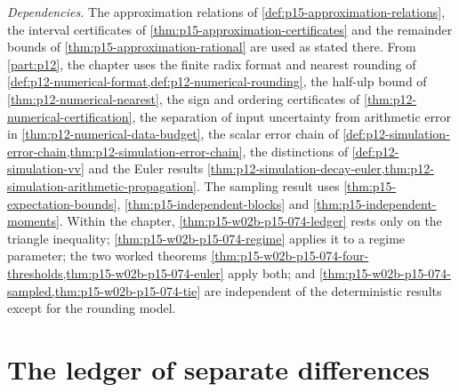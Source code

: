 \emph{Dependencies.} The approximation relations of
\cref{def:p15-approximation-relations}, the interval certificates of
\cref{thm:p15-approximation-certificates} and the remainder bounds of
\cref{thm:p15-approximation-rational} are used as stated there. From
\cref{part:p12}, the chapter uses the finite radix format and nearest
rounding of \cref{def:p12-numerical-format,def:p12-numerical-rounding},
the half-ulp bound of \cref{thm:p12-numerical-nearest}, the sign and
ordering certificates of \cref{thm:p12-numerical-certification}, the
separation of input uncertainty from arithmetic error in
\cref{thm:p12-numerical-data-budget}, the scalar error chain of
\cref{def:p12-simulation-error-chain,thm:p12-simulation-error-chain}, the
distinctions of \cref{def:p12-simulation-vv} and the Euler results
\cref{thm:p12-simulation-decay-euler,thm:p12-simulation-arithmetic-propagation}.
The sampling result uses \cref{thm:p15-expectation-bounds},
\cref{thm:p15-independent-blocks} and \cref{thm:p15-independent-moments}.
Within the chapter, \cref{thm:p15-w02b-p15-074-ledger} rests only on the
triangle inequality; \cref{thm:p15-w02b-p15-074-regime} applies it to a
regime parameter; the two worked theorems
\cref{thm:p15-w02b-p15-074-four-thresholds,thm:p15-w02b-p15-074-euler}
apply both; and \cref{thm:p15-w02b-p15-074-sampled,thm:p15-w02b-p15-074-tie}
are independent of the deterministic results except for the rounding model.

\section{The ledger of separate differences}
\label{sec:p15-w02b-p15-074-ledger}

